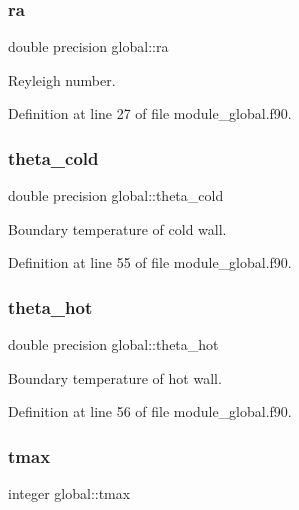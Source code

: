 \mbox{\label{namespaceglobal_a7b363950bb58d4e52dda12a928b2b9e2}} 
\subsubsection{\texorpdfstring{ra}{ra}}
{\footnotesize\ttfamily double precision global\+::ra}



Reyleigh number. 



Definition at line 27 of file module\+\_\+global.\+f90.

\mbox{\label{namespaceglobal_a367640054e0083add94204f1a61bd61a}} 
\subsubsection{\texorpdfstring{theta\_cold}{theta\_cold}}
{\footnotesize\ttfamily double precision global\+::theta\+\_\+cold}



Boundary temperature of cold wall. 



Definition at line 55 of file module\+\_\+global.\+f90.

\mbox{\label{namespaceglobal_a63b846fbcd5aedd45f92a0b1eb972244}} 
\subsubsection{\texorpdfstring{theta\_hot}{theta\_hot}}
{\footnotesize\ttfamily double precision global\+::theta\+\_\+hot}



Boundary temperature of hot wall. 



Definition at line 56 of file module\+\_\+global.\+f90.

\mbox{\label{namespaceglobal_ac8816f9dd096716fb9b7e61d57cc5189}} 
\subsubsection{\texorpdfstring{tmax}{tmax}}
{\footnotesize\ttfamily integer global\+::tmax}



